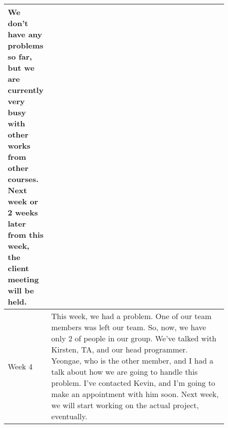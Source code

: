 \documentclass[10pt]{article}
\begin{document}
\begin{center}
\begin{tabular}{ | p{0.1\linewidth} | p{0.8\linewidth} | }
                We don't have any problems so far, but we are currently very busy with other works from other courses.
                Next week or 2 weeks later from this week, the client meeting will be held.  \\ \hline
                Week 4 &  This week, we had a problem.
                One of our team members was left our team. So, now, we have only 2 of people in our group.
                We've talked with Kirsten, TA, and our head programmer.
                Yeongae, who is the other member, and I had a talk about how we are going to handle this problem.
                I've contacted Kevin, and I'm going to make an appointment with him soon.
                Next week, we will start working on the actual project, eventually.  \\ \hline
            \end{tabular}


\end{center}
\end{document}
